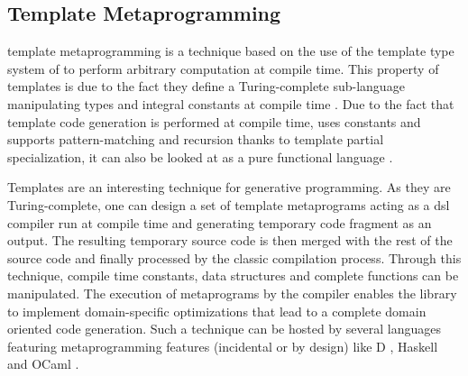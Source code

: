 \documentclass[../main]{subfiles}
\begin{document}
%
%
%


\subsection{
  Template Metaprogramming
}

\cpp template metaprogramming \cite{abrahams:2004} is a technique based on the
use of the template type system of \cpp to perform arbitrary computation at
compile time. This property of \cpp templates is due to the fact they
define a Turing-complete sub-language manipulating types and integral constants
at compile time \cite{unruh:1994}. Due to the fact that template code generation
is performed at compile time, uses constants and supports pattern-matching and
recursion thanks to template partial specialization, it can also be looked
at as a pure functional language \cite{haeri:2012}.

Templates are an interesting technique for generative programming. As they
are Turing-complete, one can design a set of template metaprograms acting as a
\acrshort{dsl} compiler run at compile time and generating temporary \cpp code
fragment as an output. The resulting temporary source code is then merged with
the rest of the source code and finally processed by the classic
compilation process. Through this technique, compile time constants,
data structures and complete functions can be manipulated.
The execution of metaprograms by the compiler enables the library to implement
domain-specific optimizations that lead to a complete domain oriented
code generation. Such a technique can be hosted by several languages featuring
metaprogramming features (incidental or by design) like D \cite{template:dlang},
Haskell \cite{sheard:2002} and OCaml \cite{serot:2008}.
\end{document}
